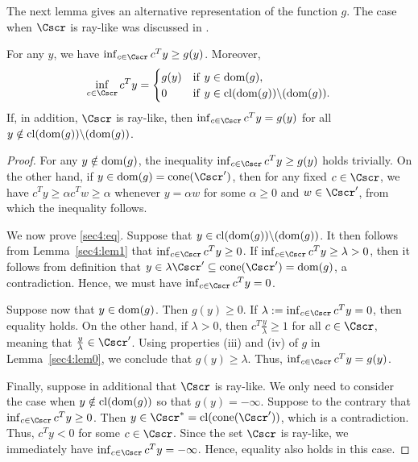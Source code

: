 \documentclass{siamltex}   %
\begin{document}
  The next lemma gives an alternative representation of the function $g$. The case when $\Cscr$
  is ray-like was discussed in \cite[Corollary~14B]{McLinden:1978}.

  \begin{lemma}\label{sec4:lem2}
    For any $y$, we have $\inf_{c\in \Cscr}c^Ty\ge g(y)$. Moreover,
    \begin{equation}\label{sec4:eq}
      \inf_{c\in \Cscr}c^Ty = \begin{cases}
        g(y)& {\rm if\ }y\in {\rm dom}(g),\\
        0& {\rm if\ }y\in {\rm cl}({\rm dom}(g))\backslash ({\rm dom}(g)).
      \end{cases}
    \end{equation}
    If, in addition, $\Cscr$ is ray-like, then $\inf_{c\in \Cscr}c^Ty= g(y)$
    for all $y\notin {\rm cl}({\rm dom}(g))\backslash ({\rm dom}(g))$.
  \end{lemma}
  \begin{proof}
    For any $y\notin {\rm dom}(g)$, the inequality $\inf_{c\in \Cscr}c^Ty\ge g(y)$ holds trivially.
    On the other hand, if $y\in {\rm dom}(g) = {\rm cone}(\Cscr')$, then
    for any fixed $c\in \Cscr$, we have $c^Ty \ge \alpha c^Tw\ge \alpha$ whenever $y = \alpha w$ for some $\alpha \ge 0$ and $w\in \Cscr'$,
    from which the inequality follows.

    We now prove \eqref{sec4:eq}.
    Suppose that $y\in {\rm cl}({\rm dom}(g))\backslash ({\rm dom}(g))$. It then follows from Lemma~\ref{sec4:lem1} that $\inf_{c\in \Cscr}c^Ty\ge 0$.
    If $\inf_{c\in \Cscr}c^Ty\ge \lambda > 0$, then it follows from definition that $y\in \lambda \Cscr'\subseteq {\rm cone}(\Cscr') = {\rm dom}(g)$, a contradiction.
    Hence, we must have $\inf_{c\in \Cscr}c^Ty=0$.

    Suppose now that $y\in {\rm dom}(g)$. Then $g(y)\ge 0$. If $\lambda := \inf_{c\in \Cscr}c^Ty = 0$, then equality holds.
    On the other hand, if $\lambda > 0$, then $c^T\frac{y}{\lambda}\ge 1$ for all $c\in \Cscr$, meaning that $\frac{y}{\lambda}\in \Cscr'$.
    Using properties {\rm (iii)} and {\rm (iv)} of $g$ in Lemma~\ref{sec4:lem0}, we conclude that $g(y)\ge \lambda$. Thus, $\inf_{c\in \Cscr}c^Ty= g(y)$.

    Finally, suppose in additional that $\Cscr$ is ray-like.
    We only need to consider the case when $y\notin {\rm cl}({\rm dom}(g))$ so that $g(y)=-\infty$. Suppose to the contrary that
    $\inf_{c\in \Cscr}c^Ty\ge 0$.
    Then $y\in \Cscr^*={\rm cl}({\rm cone}(\Cscr'))$, which is a contradiction. Thus, $c^Ty<0$ for some $c\in \Cscr$. Since
    the set $\Cscr$ is ray-like, we immediately have $\inf_{c\in \Cscr}c^Ty = -\infty$. Hence, equality also holds in this case.
  \end{proof}
\end{document}
